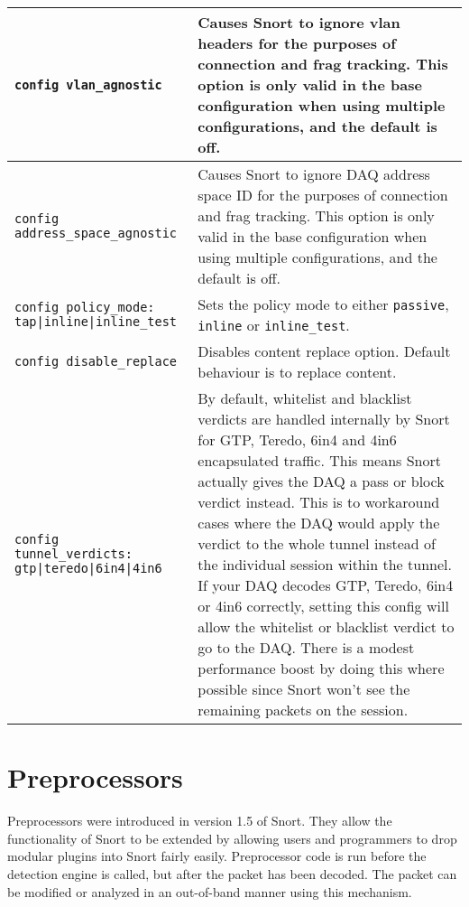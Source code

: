 \documentclass[english]{report}
\begin{document}
\begin{center}
\begin{longtable}[t]{| p{2.5in} | p{3.5in} |}
\hline
\texttt{config vlan\_agnostic} & Causes Snort to ignore vlan headers for
the purposes of connection and frag tracking.  This option is only valid in the
base configuration when using multiple configurations, and the default is off.
\\

\hline
\texttt{config address\_space\_agnostic} & Causes Snort to ignore DAQ
address space ID for the purposes of connection and frag tracking.  This option
is only valid in the base configuration when using multiple configurations, and
the default is off.  \\

\hline
\texttt{config policy\_mode: tap|inline|inline\_test} & Sets the policy
mode to either \texttt{passive}, \texttt{inline} or \texttt{inline\_test}. \\

\hline
\texttt{config disable\_replace} & Disables content replace option. Default
behaviour is to replace content. \\

\hline \texttt{config tunnel\_verdicts: gtp|teredo|6in4|4in6} & By default, whitelist
and blacklist verdicts are handled internally by Snort for GTP, Teredo, 6in4 and 4in6
encapsulated traffic.  This means Snort actually gives the DAQ a pass or block
verdict instead.  This is to workaround cases where the DAQ would apply
the verdict to the whole tunnel instead of the individual session within the
tunnel.  If your DAQ decodes GTP, Teredo, 6in4 or 4in6 correctly, setting this config
will allow the whitelist or blacklist verdict to go to the DAQ.  There is a
modest performance boost by doing this where possible since Snort won't see the
remaining packets on the session. \\

\hline
\end{longtable}
\end{center}

\section{Preprocessors}

Preprocessors were introduced in version 1.5 of Snort. They allow the
functionality of Snort to be extended by allowing users and programmers to drop
modular plugins into Snort fairly easily.  Preprocessor code is run before the
detection engine is called, but after the packet has been decoded. The packet
can be modified or analyzed in an out-of-band manner using this mechanism.
\end{document}
